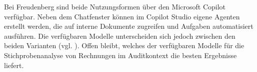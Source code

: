 Bei Freudenberg sind beide Nutzungsformen über den Microsoft Copilot verfügbar. Neben dem Chatfenster können im Copilot Studio eigene Agenten erstellt werden, die auf interne Dokumente zugreifen und Aufgaben automatisiert ausführen. Die verfügbaren Modelle unterscheiden sich jedoch zwischen den beiden Varianten (vgl. \cite{freudenberg2026copilot}). Offen bleibt, welches der verfügbaren Modelle für die Stichprobenanalyse von Rechnungen im Auditkontext die besten Ergebnisse liefert.